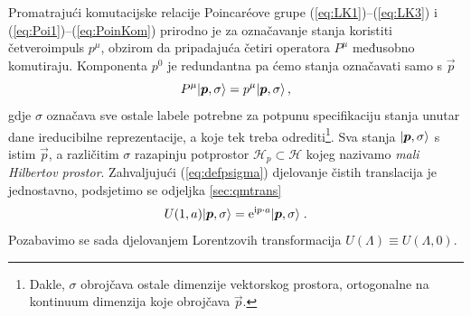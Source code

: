 Promatrajući komutacijske relacije Poincar\'{e}ove grupe 
(\ref{eq:LK1})--(\ref{eq:LK3}) i (\ref{eq:Poi1})--(\ref{eq:PoinKom})
prirodno je za označavanje stanja koristiti četveroimpuls $p^{\mu}$,
obzirom da pripadajuća četiri operatora $P^{\mu}$ međusobno komutiraju.
Komponenta $p^0$ je redundantna pa ćemo stanja označavati samo s $\vec{p}$
\begin{equation}
    P^{\mu} \ket{\vec{p}, \sigma} = p^{\mu} \ket{\vec{p}, \sigma} \,,
    \label{eq:defpsigma}
\end{equation}
gdje $\sigma$ označava sve ostale labele potrebne za potpunu specifikaciju
stanja unutar dane ireducibilne reprezentacije, a koje tek treba odrediti\footnote{Dakle,
    $\sigma$ obrojčava ostale dimenzije
vektorskog prostora, ortogonalne na kontinuum dimenzija koje obrojčava $\vec{p}$.}.
Sva stanja $\ket{\vec{p}, \sigma}$ s istim $\vec{p}$, a različitim $\sigma$
razapinju potprostor $\mathcal{H}_{p} \subset \mathcal{H}$ kojeg nazivamo
\emph{mali Hilbertov prostor}. 
Zahvaljujući (\ref{eq:defpsigma}) djelovanje
čistih translacija je jednostavno, podsjetimo se odjeljka \ref{sec:qmtrans} 
\begin{equation}
    U(1, a) \ket{\vec{p}, \sigma} = \rme^{\rmi p\cdot a}  \ket{\vec{p}, \sigma}\;.
    \label{eq:PoiTrans}
\end{equation}
Pozabavimo se sada djelovanjem Lorentzovih transformacija $U(\Lambda)\equiv U(\Lambda, 0)$.



